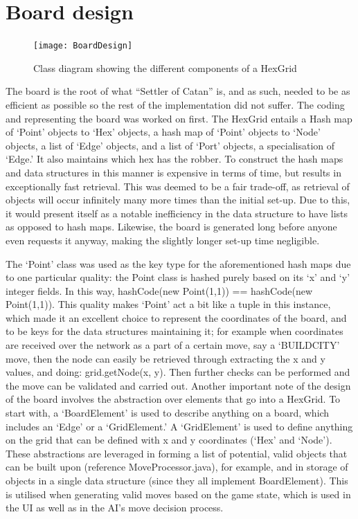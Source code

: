 \documentclass[a4paper,doc,draftfirst]{apa6}
\begin{document}
\section{Board design}
\begin{figure}[hbtp]
      \texttt{[image: BoardDesign]}
      \caption{Class diagram showing the different components of a HexGrid}
\end{figure}
The board is the root of what “Settler of Catan” is, and as such, needed to be as efficient as possible so the rest of the implementation did not suffer. The coding and representing the board was worked on first. The HexGrid entails a Hash map of ‘Point’ objects to ‘Hex’ objects, a hash map of ‘Point’ objects to ‘Node’ objects, a list of ‘Edge’ objects, and a list of ‘Port’ objects, a specialisation of ‘Edge.’ It also maintains which hex has the robber. To construct the hash maps and data structures in this manner is expensive in terms of time, but results in exceptionally fast retrieval. This was deemed to be a fair trade-off, as retrieval of objects will occur infinitely many more times than the initial set-up. Due to this, it would present itself as a notable inefficiency in the data structure to have lists as opposed to hash maps. Likewise, the board is generated long before anyone even requests it anyway, making the slightly longer set-up time negligible.

The ‘Point’ class was used as the key type for the aforementioned hash maps due to one particular quality: the Point class is hashed purely based on its ‘x’ and ‘y’ integer fields. In this way, hashCode(new Point(1,1)) == hashCode(new Point(1,1)). This quality makes ‘Point’ act a bit like a tuple in this instance, which made it an excellent choice to represent the coordinates of the board, and to be keys for the data structures maintaining it; for example when coordinates are received over the network as a part of a certain move, say a ‘BUILDCITY’ move, then the node can easily be retrieved through extracting the x and y values, and doing: grid.getNode(x, y). Then further checks can be performed and the move can be validated and carried out. Another important note of the design of the board involves the abstraction over elements that go into a HexGrid. To start with, a ‘BoardElement’ is used to describe anything on a board, which includes an ‘Edge’ or a ‘GridElement.’ A ‘GridElement’ is used to define anything on the grid that can be defined with x and y coordinates (‘Hex’ and ‘Node’). These abstractions are leveraged in forming a list of potential, valid objects that can be built upon (reference MoveProcessor.java), for example, and in storage of objects in a single data structure (since they all implement BoardElement). This is utilised when generating valid moves based on the game state, which is used in the UI as well as in the AI’s move decision process.
\end{document}
